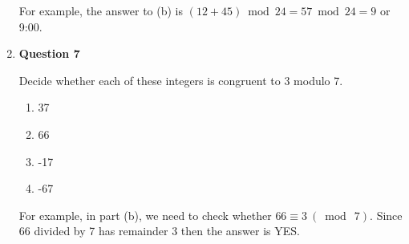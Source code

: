 \documentclass[11pt]{article}
\begin{document}
\begin{enumerate}
For example, the answer to (b) is $(12+45) \bmod 24 = 57 \bmod 24 = 9 $ or 9:00.

\item
\textbf{Question 7}

Decide whether each of these integers is congruent to 3 modulo 7.

\begin{enumerate}[label=(\alph*)]
\item 37
\item 66
\item -17
\item -67
\end{enumerate}

For example, in part (b), we need to check whether $66 \equiv 3 \: (\bmod \: 7)$. Since 66 divided by 7 has remainder 3 then the answer is YES.

\end{enumerate}
\end{document}
